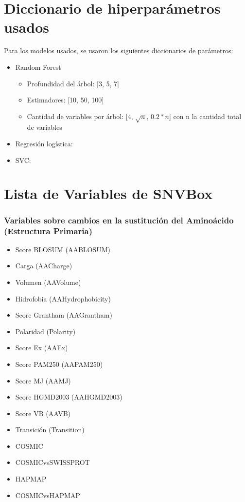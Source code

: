 \section{Diccionario de hiperparámetros usados}

Para los modelos usados, se usaron los siguientes diccionarios de parámetros:
\begin{itemize}
    \item Random Forest
        \begin{itemize}
            \item Profundidad del árbol: [3, 5, 7]
            \item Estimadores: [10, 50, 100]
            \item Cantidad de variables por árbol: [4, $\sqrt{n}$, $0.2*n$] con n la cantidad total de variables
        \end{itemize} 
    \item Regresión logística:
    \item SVC:
\end{itemize}


\section{Lista de Variables de SNVBox}

\subsubsection{Variables sobre cambios en la sustitución del Aminoácido (Estructura Primaria)}
\begin{itemize}
    \item Score BLOSUM (AABLOSUM)
    \item Carga (AACharge)
    \item Volumen (AAVolume)
    \item Hidrofobia (AAHydrophobicity)
    \item Score Grantham (AAGrantham)
    \item Polaridad (Polarity)
    \item Score Ex (AAEx)
    \item Score PAM250 (AAPAM250)
    \item Score MJ (AAMJ)
    \item Score HGMD2003 (AAHGMD2003)
    \item Score VB (AAVB)
    \item Transición (Transition)
    \item COSMIC
    \item COSMICvsSWISSPROT
    \item HAPMAP
    \item COSMICvsHAPMAP
\end{itemize}

